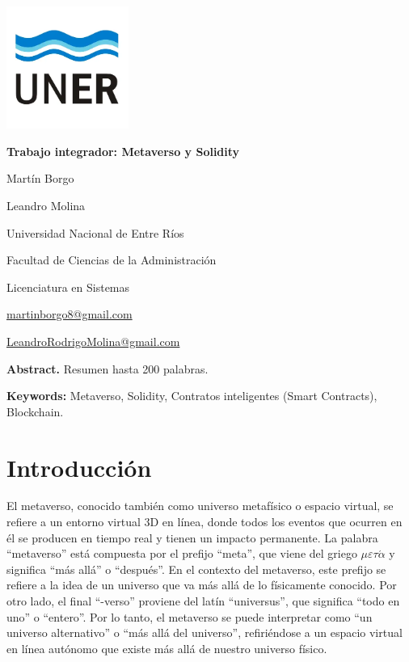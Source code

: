 \documentclass[a4paper,10pt]{article}
\begin{document}
	\pagestyle{empty}
	\begin{titlepage}
		\centering
		\vspace*{1.5cm}
		\includegraphics[width=0.3\textwidth]{unerlogo.png}
		\linebreak
		{\fontsize{14}{17}\bfseries Trabajo integrador: Metaverso y Solidity\par}
		{\small Martín Borgo\par}
		{\small Leandro Molina\par}
		{\normalsize Universidad Nacional de Entre Ríos\par}
		{\normalsize Facultad de Ciencias de la Administración\par}
		{\normalsize Licenciatura en Sistemas \par}
		{\small \href{mailto:martinborgo8@gmail.com}{martinborgo8@gmail.com}\par}
		{\small \href{mailto:LeandroRodrigoMolina@gmail.com}{LeandroRodrigoMolina@gmail.com}\par}
		
		{\small \textbf{Abstract.} Resumen hasta 200 palabras. \par}
		{\small \textbf{Keywords:} Metaverso, Solidity, Contratos inteligentes (Smart Contracts), Blockchain.\par}
	\end{titlepage}
	
	\section{Introducción}
	El metaverso, conocido también como universo metafísico o espacio virtual, se refiere a un entorno virtual 3D en línea, donde todos los eventos que ocurren en él se producen en tiempo real y tienen un impacto permanente. La palabra “metaverso” está compuesta por el prefijo “meta”, que viene del griego \( \mu\varepsilon\tau\acute{\alpha} \) y significa “más allá” o “después”. En el contexto del metaverso, este prefijo se refiere a la idea de un universo que va más allá de lo físicamente conocido. Por otro lado, el final “-verso” proviene del latín “universus”, que significa “todo en uno” o “entero”. Por lo tanto, el metaverso se puede interpretar como “un universo alternativo” o “más allá del universo”, refiriéndose a un espacio virtual en línea autónomo que existe más allá de nuestro universo físico.
	
\end{document}
